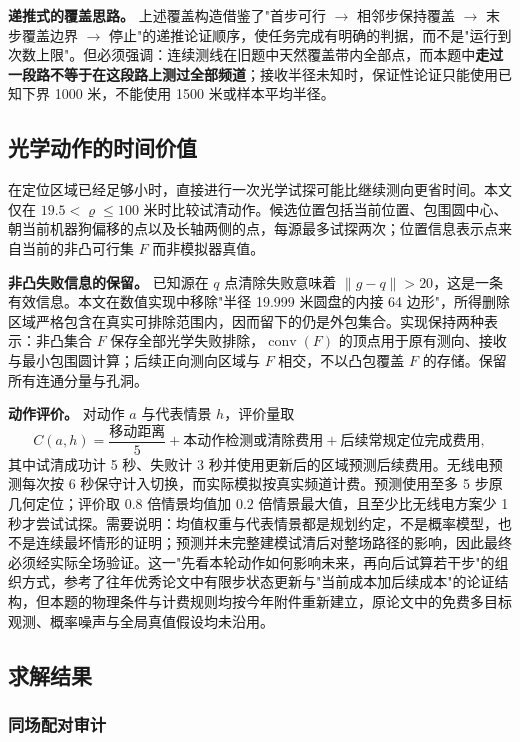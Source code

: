 \textbf{递推式的覆盖思路。} 上述覆盖构造借鉴了"首步可行 $\to$ 相邻步保持覆盖 $\to$ 末步覆盖边界 $\to$ 停止"的递推论证顺序，使任务完成有明确的判据，而不是"运行到次数上限"。但必须强调：连续测线在旧题中天然覆盖带内全部点，而本题中\textbf{走过一段路不等于在这段路上测过全部频道}；接收半径未知时，保证性论证只能使用已知下界 1000 米，不能使用 1500 米或样本平均半径。

\subsection{光学动作的时间价值}

在定位区域已经足够小时，直接进行一次光学试探可能比继续测向更省时间。本文仅在 $19.5<\varrho\le100$ 米时比较试清动作。候选位置包括当前位置、包围圆中心、朝当前机器狗偏移的点以及长轴两侧的点，每源最多试探两次；位置信息表示点来自当前的非凸可行集 $F$ 而非模拟器真值。

\textbf{非凸失败信息的保留。} 已知源在 $q$ 点清除失败意味着 $\lVert g-q\rVert>20$，这是一条有效信息。本文在数值实现中移除"半径 19.999 米圆盘的内接 64 边形"，所得删除区域严格包含在真实可排除范围内，因而留下的仍是外包集合。实现保持两种表示：非凸集合 $F$ 保存全部光学失败排除，$\operatorname{conv}(F)$ 的顶点用于原有测向、接收与最小包围圆计算；后续正向测向区域与 $F$ 相交，不以凸包覆盖 $F$ 的存储。保留所有连通分量与孔洞。

\textbf{动作评价。} 对动作 $a$ 与代表情景 $h$，评价量取
\begin{equation}
  C(a,h)=\frac{\text{移动距离}}{5}+\text{本动作检测或清除费用}+\text{后续常规定位完成费用},
  \label{eq:action-value}
\end{equation}
其中试清成功计 5 秒、失败计 3 秒并使用更新后的区域预测后续费用。无线电预测每次按 6 秒保守计入切换，而实际模拟按真实频道计费。预测使用至多 5 步原几何定位；评价取 $0.8$ 倍情景均值加 $0.2$ 倍情景最大值，且至少比无线电方案少 1 秒才尝试试探。需要说明：均值权重与代表情景都是规划约定，不是概率模型，也不是连续最坏情形的证明；预测并未完整建模试清后对整场路径的影响，因此最终必须经实际全场验证。这一"先看本轮动作如何影响未来，再向后试算若干步"的组织方式，参考了往年优秀论文中有限步状态更新与"当前成本加后续成本"的论证结构，但本题的物理条件与计费规则均按今年附件重新建立，原论文中的免费多目标观测、概率噪声与全局真值假设均未沿用。

\subsection{求解结果}

\subsubsection{同场配对审计}

